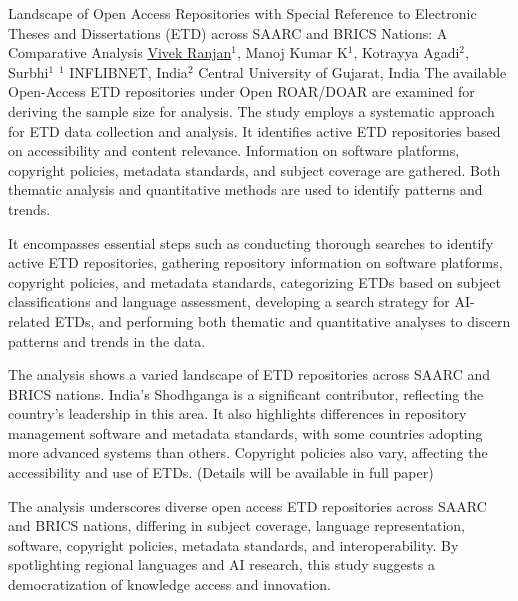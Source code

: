 \begin{abstract_online}{Landscape of Open Access Repositories with Special Reference to Electronic Theses and Dissertations (ETD) across SAARC and BRICS Nations: A Comparative Analysis}{%
        \underline{Vivek Ranjan}$^{1}$, Manoj Kumar K$^{1}$, Kotrayya  Agadi$^{2}$, Surbhi$^{1}$}{%
        }{%
        $^1$ INFLIBNET, India\newline{}$^2$ Central University of Gujarat, India}
        The available Open-Access ETD repositories under Open ROAR/DOAR are examined for deriving the sample size for analysis. The study employs a systematic approach for ETD data collection and analysis. It identifies active ETD repositories based on accessibility and content relevance. Information on software platforms, copyright policies, metadata standards, and subject coverage are gathered. Both thematic analysis and quantitative methods are used to identify patterns and trends.

        It encompasses essential steps such as conducting thorough searches to identify active ETD repositories, gathering repository information on software platforms, copyright policies, and metadata standards, categorizing ETDs based on subject classifications and language assessment, developing a search strategy for AI-related ETDs, and performing both thematic and quantitative analyses to discern patterns and trends in the data.

        The analysis shows a varied landscape of ETD repositories across SAARC and BRICS nations. India's Shodhganga is a significant contributor, reflecting the country's leadership in this area. It also highlights differences in repository management software and metadata standards, with some countries adopting more advanced systems than others. Copyright policies also vary, affecting the accessibility and use of ETDs. (Details will be available in full paper)

        The analysis underscores diverse open access ETD repositories across SAARC and BRICS nations, differing in subject coverage, language representation, software, copyright policies, metadata standards, and interoperability. By spotlighting regional languages and AI research, this study suggests a democratization of knowledge access and innovation.

    \end{abstract_online}
